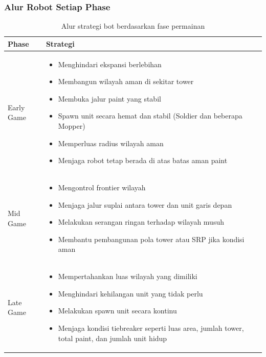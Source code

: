 \documentclass{article}
\renewcommand{\arraystretch}{1.3}
\begin{document}
\subsubsection{Alur Robot Setiap Phase}
\begin{table}[H]
\centering
\renewcommand{\arraystretch}{1.2}
\begin{tabular}{|p{3cm}|p{11cm}|}
\hline
\textbf{Phase} & \textbf{Strategi} \\
\hline

Early Game &
\begin{itemize}[leftmargin=*, nosep]
\item Menghindari ekspansi berlebihan
\item Membangun wilayah aman di sekitar tower
\item Membuka jalur paint yang stabil
\item Spawn unit secara hemat dan stabil (Soldier dan beberapa Mopper)
\item Memperluas radius wilayah aman
\item Menjaga robot tetap berada di atas batas aman paint
\end{itemize}
\\
\hline

Mid Game &
\begin{itemize}[leftmargin=*, nosep]
\item Mengontrol frontier wilayah
\item Menjaga jalur suplai antara tower dan unit garis depan
\item Melakukan serangan ringan terhadap wilayah musuh
\item Membantu pembangunan pola tower atau SRP jika kondisi aman
\end{itemize}
\\
\hline

Late Game &
\begin{itemize}[leftmargin=*, nosep]
\item Mempertahankan luas wilayah yang dimiliki
\item Menghindari kehilangan unit yang tidak perlu
\item Melakukan spawn unit secara kontinu
\item Menjaga kondisi tiebreaker seperti luas area, jumlah tower, total paint, dan jumlah unit hidup
\end{itemize}
\\
\hline

\end{tabular}
\caption{Alur strategi bot berdasarkan fase permainan}
\end{table}
\end{document}
